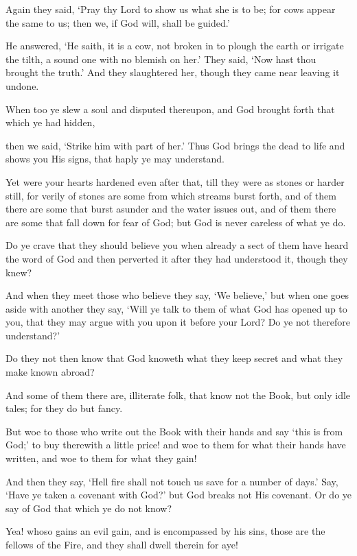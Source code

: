 \documentclass[fontsize=14pt, letterpaper, notitlepage, openany, DIV=12]{scrbook} %
\begin{document}
\noindent[2:70]
Again they said, `Pray thy Lord to show us what she is to be; for cows appear the same to
us; then we, if God will, shall be guided.'

\noindent[2:71]
He answered, `He saith, it is a cow, not broken in to plough the earth or irrigate the tilth,
a sound one with no blemish on her.' They said, `Now hast thou brought the truth.' And they
slaughtered her, though they came near leaving it undone.

\noindent[2:72]
When too ye slew a soul and disputed thereupon, and God brought forth that which ye
had hidden,

\noindent[2:73]
then we said, `Strike him with part of her.' Thus God brings the dead to life and shows
you His signs, that haply ye may understand.

\noindent[2:74]
Yet were your hearts hardened even after that, till they were as stones or harder still, for
verily of stones are some from which streams burst forth, and of them there are some that burst
asunder and the water issues out, and of them there are some that fall down for fear of God; but
God is never careless of what ye do.

\noindent[2:75]
Do ye crave that they should believe you when already a sect of them have heard the
word of God and then perverted it after they had understood it, though they knew?

\noindent[2:76]
And when they meet those who believe they say, `We believe,' but when one goes aside
with another they say, `Will ye talk to them of what God has opened up to you, that they may
argue with you upon it before your Lord? Do ye not therefore understand?'

\noindent[2:77]
Do they not then know that God knoweth what they keep secret and what they make
known abroad?

\noindent[2:78]
And some of them there are, illiterate folk, that know not the Book, but only idle tales;
for they do but fancy.

\noindent[2:79]
But woe to those who write out the Book with their hands and say `this is from God;' to
buy therewith a little price! and woe to them for what their hands have written, and woe to them
for what they gain!

\noindent[2:80]
And then they say, `Hell fire shall not touch us save for a number of days.' Say, `Have ye
taken a covenant with God?' but God breaks not His covenant. Or do ye say of God that which
ye do not know?

\noindent[2:81]
Yea! whoso gains an evil gain, and is encompassed by his sins, those are the fellows of
the Fire, and they shall dwell therein for aye!
\end{document}
